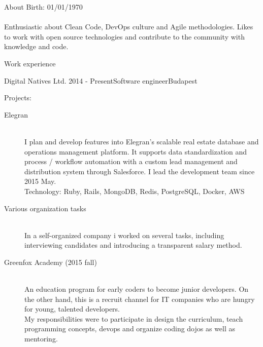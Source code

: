 \documentclass{resume} %
\begin{document}
\begin{rSection}{About}
 Birth: 01/01/1970 \\
 \\
 Enthusiastic about Clean Code, DevOps culture and Agile methodologies. Likes to work
 with open source technologies and contribute to the community with knowledge and code.
\end{rSection}


\begin{rSection}{Work experience}

\begin{rSubsection}{Digital Natives Ltd.}
{2014 - Present}{Software engineer}{Budapest}
\item Projects:
  \begin{description}
    \item[Elegran] \hfill \\
    I plan and develop features into Elegran’s scalable real estate database and
    operations management platform. It supports data standardization and
    process / workflow automation with a custom lead management and distribution
    system through Salesforce. I lead the development team since 2015 May. \\
    Technology: Ruby, Rails, MongoDB, Redis, PostgreSQL, Docker, AWS
  \end{description}
	\begin{description}
		\item[Various organization tasks] \hfill \\
		In a self-organized company i worked on several tasks, including interviewing candidates
    and introducing a transparent salary method.
	\end{description}
	\begin{description}
		\item[Greenfox Academy (2015 fall)] \hfill \\
		An education program for early coders to become junior developers.
		On the other hand, this is a recruit channel for IT companies who are hungry
		for young, talented developers. \\
		My responsibilities were to participate in design the curriculum, teach
		programming concepts, devops and organize coding dojos as well as mentoring.
	\end{description}
\end{rSubsection}


\end{rSection}
\end{document}
